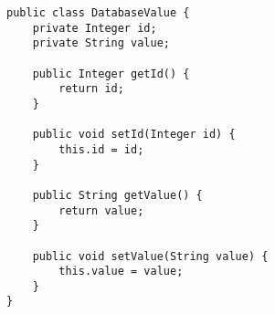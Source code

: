 
\begin{lstlisting}[caption={Example of object loading from database}, label={code:model}]
public class DatabaseValue {
    private Integer id;
    private String value;

    public Integer getId() {
        return id;
    }

    public void setId(Integer id) {
        this.id = id;
    }

    public String getValue() {
        return value;
    }

    public void setValue(String value) {
        this.value = value;
    }
}
\end{lstlisting}

